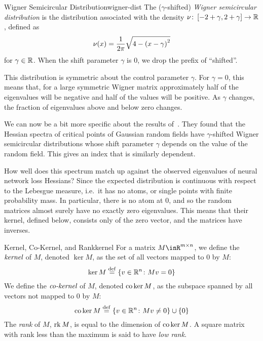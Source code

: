 \documentclass[../../thesis.tex]{subfiles}
\begin{document}
\begin{definition}{Wigner Semicircular Distribution}{wigner-dist}
	The ($\gamma$-shifted) \emph{Wigner semicircular distribution}
	is the distribution associated with the density
	$\nu \colon \left[-2+\gamma, 2+\gamma\right] \to \mathbb{R}$,
	defined as
	\begin{equation}\equationlabel{def-wigner-dist}
		\nu(x) = \frac{1}{2\pi}\sqrt{4 - {(x-\gamma)}^2}
	\end{equation}
	for $\gamma\in\mathbb{R}$.
	When the shift parameter $\gamma$ is $0$,
	we drop the prefix of \enquote{shifted}.
\end{definition}
This distribution is symmetric about the control parameter $\gamma$.
For $\gamma=0$, this means that, for a large symmetric Wigner matrix
approximately half of the eigenvalues will
be negative and half of the values will be positive.
As $\gamma$ changes, the fraction of eigenvalues above and below zero changes.

We can now be a bit more specific about the results of~\cite{bray2007}.
They found that the Hessian spectra of
critical points of Gaussian random fields
have $\gamma$-shifted Wigner semicircular distributions
whose shift parameter $\gamma$ depends on the value of the random field.
This gives an index that is similarly dependent.

How well does this spectrum match up against the observed eigenvalues
of neural network loss Hessians?
Since the expected distribution is
continuous with respect to the Lebesgue measure,
i.e.~it has no atoms, or single points with finite probability mass.
In particular, there is no atom at $0$,
and so the random matrices almost surely have no exactly zero eigenvalues.
This means that their kernel, defined below, consists only of the zero vector,
and the matrices have inverses.

\begin{definition}{Kernel, Co-Kernel, and Rank}{kernel}
	For a matrix $M\inR^{m\times n}$,
	we define the $\emph{kernel}$ of $M$,
	denoted $\ker M$,
	as the set of all vectors mapped to $0$ by $M$:
	\begin{equation}\equationlabel{def-ker}
		\ker M \defeq \Set{v \in \R^n \suchthat Mv = 0}
	\end{equation}
	We define the $\emph{co-kernel}$ of $M$,
	denoted $\operatorname*{co}\ker M$,
	as the subspace spanned by all vectors not mapped to $0$ by $M$:
	\begin{equation}\equationlabel{def-coker}
		\co\ker M \defeq \Set{v \in \R^n \suchthat Mv \neq 0} \cup \Set{0}
	\end{equation}
	The \emph{rank} of $M$, $\operatorname*{rk} M$,
	is equal to the dimension of $\operatorname*{co}\ker M$.
	A square matrix with rank less than the maximum
	is said to have \emph{low rank}.
\end{definition}
\end{document}
